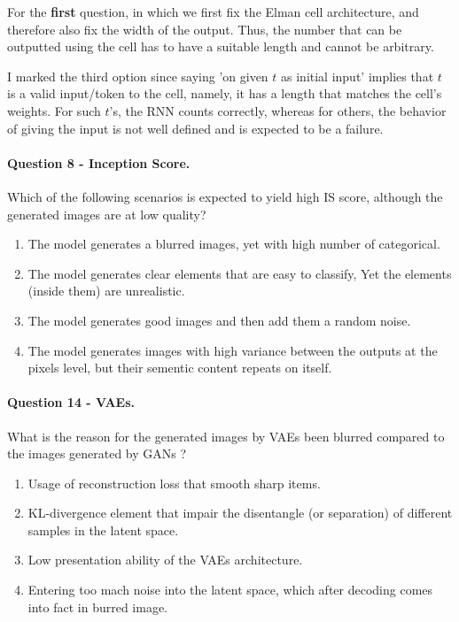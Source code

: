 \documentclass{article}
\begin{document}
For the \textbf{first} question, in which we first fix the Elman cell architecture, and therefore also fix the width of the output. Thus, the number that can be outputted using the cell has to have a suitable length and cannot be arbitrary.

I marked the third option since saying 'on given $t$ as initial input' implies that $t$ is a valid input/token to the cell, namely, it has a length that matches the cell's weights. For such $t$'s, the RNN counts correctly, whereas for others, the behavior of giving the input is not well defined and is expected to be a failure.


\paragraph{ Question 8 - Inception Score. } Which of the following scenarios is expected to yield high IS score, although the generated images are at low quality?
\begin{enumerate}
  \item The model generates a blurred images, yet with high number of categorical.  
  \item The model generates clear elements that are easy to classify, Yet the elements (inside them) are unrealistic. 
  \item The model generates good images and then add them a random noise. 
  \item The model generates images with high variance between the outputs at the pixels level, but their sementic content repeats on itself.    
\end{enumerate}
\paragraph{ Question 14 - VAEs. } What is the reason for the generated images by VAEs been blurred compared to the images generated by GANs ?   
\begin{enumerate}
  \item Usage of reconstruction loss that smooth sharp items.   
  \item  KL-divergence element that impair the disentangle (or separation) of different samples in the latent space. 
  \item Low presentation ability of the VAEs architecture. 
  \item Entering too mach noise into the latent space, which after decoding comes into fact in burred image. 

\end{enumerate}
\end{document}
